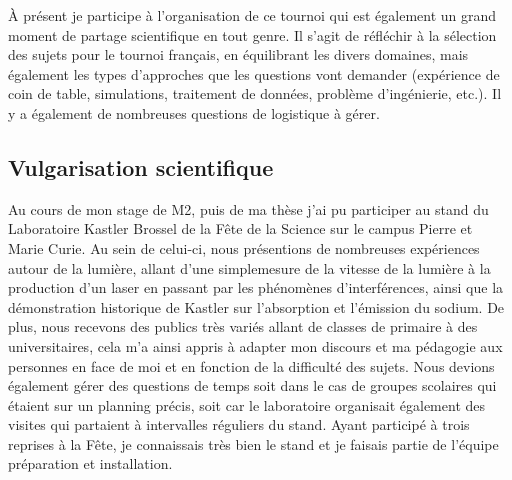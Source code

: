 \documentclass[a4paper,11pt]{article} %
\begin{document}
	\`A présent je participe à l'organisation de ce tournoi qui est également un grand moment de partage scientifique en tout genre. Il s'agit de réfléchir à la sélection des sujets pour le tournoi français, en équilibrant les divers domaines, mais également les types d'approches que les questions vont demander (expérience de coin de table, simulations, traitement de données, problème d'ingénierie, etc.). Il y a également de nombreuses questions de logistique à gérer.
	
	
	\subsection{Vulgarisation scientifique}
	Au cours de mon stage de M2, puis de ma thèse j'ai pu participer au stand du Laboratoire Kastler Brossel de la Fête de la Science sur le campus Pierre et Marie Curie. Au sein de celui-ci, nous présentions de nombreuses expériences autour de la lumière, allant d'une \textgravedbl simple\textacutedbl mesure de la vitesse de la lumière à la production d'un laser en passant par les phénomènes d'interférences, ainsi que la démonstration historique de Kastler sur l'absorption et l'émission du sodium. De plus, nous recevons des publics très variés allant de classes de primaire à des universitaires, cela m'a ainsi appris à adapter mon discours et ma pédagogie aux personnes en face de moi et en fonction de la difficulté des sujets. Nous devions également gérer des questions de temps soit dans le cas de groupes scolaires qui étaient sur un planning précis, soit car le laboratoire organisait également des visites qui partaient à intervalles réguliers du stand. Ayant participé à trois reprises à la Fête, je connaissais très bien le stand et je faisais partie de l'équipe préparation et installation.
	
\end{document}
